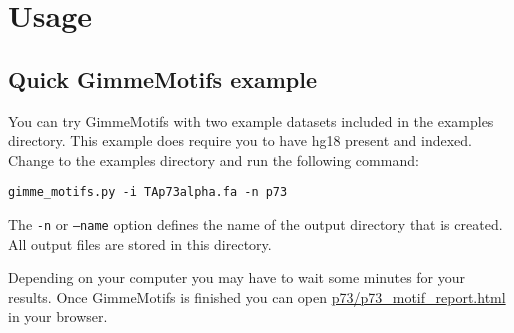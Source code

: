 \documentclass[10pt]{article}
\begin{document}
\section{Usage}
\subsection{Quick GimmeMotifs example}
You can try GimmeMotifs with two example datasets included in the examples directory. This example does require you to have hg18 present and indexed. 
Change to the examples directory and run the following command:
\begin{verbatim}
gimme_motifs.py -i TAp73alpha.fa -n p73
\end{verbatim}

The \texttt{-n} or \texttt{--name} option defines the name of the output directory that is created. All output files are stored in this directory.

Depending on your computer you may have to wait some minutes for your results. Once GimmeMotifs is finished you can open \url{p73/p73_motif_report.html} in your browser. 
\end{document}
